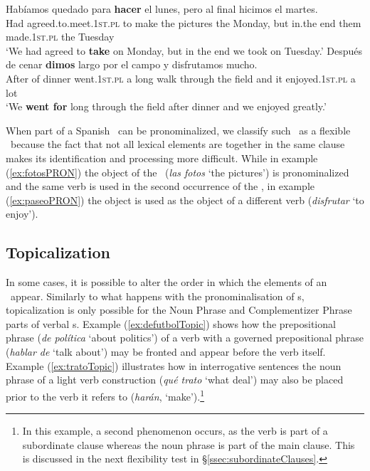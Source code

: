 \documentclass[output=paper]{langsci/langscibook}
\begin{document}
\begin{exe}
\ex \label{ex:fotosPRON}
\gll Habíamos quedado para \textbf{hacer} \textbf{} \textbf{} el lunes, pero al final \textbf{} hicimos el martes.\\
Had {agreed.to.meet.\textsc{1st.pl}} to make the pictures the Monday, but {in.the} end them {made.\textsc{1st.pl}} the Tuesday\\
\glt `We had agreed to \textbf{take } on Monday, but in the end we took \textbf{} on Tuesday.'
\ex \label{ex:paseoPRON}
\gll Después de cenar \textbf{dimos} \textbf{} largo \textbf{} por el campo y \textbf{} disfrutamos mucho. \\
After of dinner {went.\textsc{1st.pl}} a long walk through the field and it {enjoyed.\textsc{1st.pl}} {a lot} \\
\glt `We \textbf{went for } long \textbf{} through the field after dinner and we enjoyed \textbf{} greatly.'
\end{exe}

When part of a Spanish \mwe\ can be pronominalized, we classify such \mwe\ as a flexible \mwe\ because the fact that not all lexical elements are together in the same clause makes its identification and processing more difficult. 
While in example (\ref{ex:fotosPRON}) the object of the \mwe\ (\textit{las fotos} `the pictures') is pronominalized and the same verb is used in the second occurrence of the \mwe, in example (\ref{ex:paseoPRON}) the object is used as the object of a different verb (\textit{disfrutar} `to enjoy').

\subsection{Topicalization}
\label{ssec:topicalization}

In some cases, it is possible to alter the order in which the elements of an \mwe\ appear.
Similarly to what happens with the pronominalisation of \mwe s, topicalization is only possible for the Noun Phrase and Complementizer Phrase parts of verbal \mwe s.
Example (\ref{ex:defutbolTopic}) shows how the prepositional phrase (\textit{de política} `about politics') of a verb with a governed prepositional phrase (\textit{hablar de} `talk about') may be fronted and appear before the verb itself.
Example (\ref{ex:tratoTopic}) illustrates how in interrogative sentences the noun phrase of a light verb construction (\textit{qué trato} `what deal') 
may also be placed prior to the verb it refers to (\textit{harán}, `make').\footnote{In this example, a second phenomenon occurs, as the verb is part of a subordinate clause whereas the noun phrase is part of the main clause. This is discussed in the next flexibility test in §\ref{ssec:subordinateClauses}.}
\end{document}
